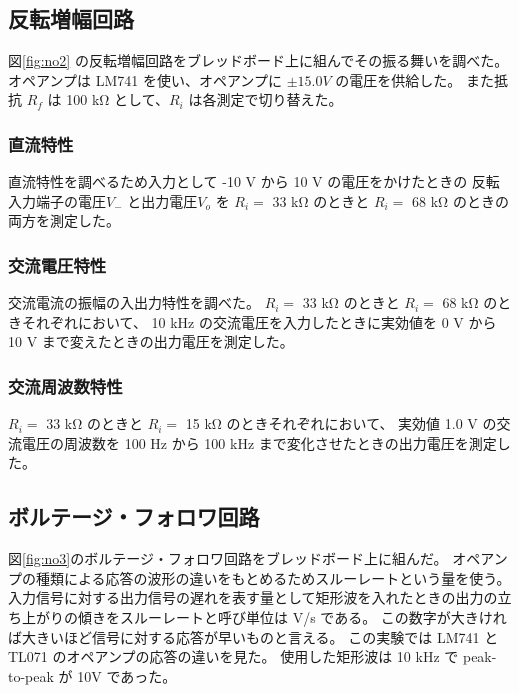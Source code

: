 \documentclass[11pt,dvipdfmx,a4paper]{jsarticle}
\begin{document}
\subsection{反転増幅回路}
図\ref{fig:no2} の反転増幅回路をブレッドボード上に組んでその振る舞いを調べた。
オペアンプは LM741 を使い、オペアンプに \(\pm 15.0 V\) の電圧を供給した。
また抵抗 \(R_f\) は 100 k\si{\ohm} として、\(R_i\) は各測定で切り替えた。
\subsubsection{直流特性}
直流特性を調べるため入力として -10 V から 10 V の電圧をかけたときの
反転入力端子の電圧\(V_{-}\) と出力電圧\(V_{o}\) を
\(R_i =\) 33 k\si{\ohm} のときと
\(R_i =\) 68 k\si{\ohm} のときの両方を測定した。

\subsubsection{交流電圧特性}
交流電流の振幅の入出力特性を調べた。
\(R_i =\) 33 k\si{\ohm} のときと
\(R_i =\) 68 k\si{\ohm} のときそれぞれにおいて、
10 kHz の交流電圧を入力したときに実効値を 0 V から 10 V まで変えたときの出力電圧を測定した。

\subsubsection{交流周波数特性}
\(R_i =\) 33 k\si{\ohm} のときと
\(R_i =\) 15 k\si{\ohm} のときそれぞれにおいて、
実効値 1.0 V の交流電圧の周波数を 100 Hz から 100 kHz まで変化させたときの出力電圧を測定した。

\subsection{ボルテージ・フォロワ回路}
図\ref{fig:no3}のボルテージ・フォロワ回路をブレッドボード上に組んだ。
オペアンプの種類による応答の波形の違いをもとめるためスルーレートという量を使う。
入力信号に対する出力信号の遅れを表す量として矩形波を入れたときの出力の立ち上がりの傾きをスルーレートと呼び単位は V/s である。
この数字が大きければ大きいほど信号に対する応答が早いものと言える。
この実験では LM741 と TL071 のオペアンプの応答の違いを見た。
使用した矩形波は 10 kHz で peak-to-peak が 10V であった。
\end{document}
